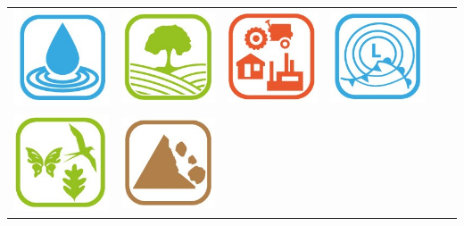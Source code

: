 \begin{frame}
\begin{center}
\begin{center}
\begin{tabular}{c c c c c c}
\includegraphics[scale=0.2]{obrazky/INSPIRE_Temata/HY.jpg} & \includegraphics[scale=0.2]{obrazky/INSPIRE_Temata/LC.jpg} & \includegraphics[scale=0.2]{obrazky/INSPIRE_Temata/LU.jpg} & \includegraphics[scale=0.2]{obrazky/INSPIRE_Temata/MF.jpg}\\
\includegraphics[scale=0.2]{obrazky/INSPIRE_Temata/SD.jpg} & \includegraphics[scale=0.2]{obrazky/INSPIRE_Temata/NZ.jpg} &

\end{tabular}
\end{center}
\end{center}
\end{frame}
